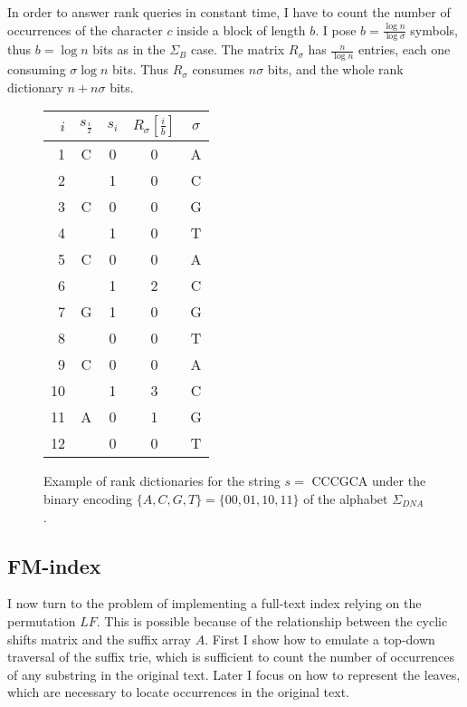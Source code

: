 In order to answer rank queries in constant time, I have to count the number of occurrences of the character $c$ inside a block of length $b$.
I pose $b=\frac{\log{n}}{\log{\sigma}}$ symbols, thus $b=\log{n}$ bits as in the $\Sigma_B$ case.
The matrix $R_{\sigma}$ has $\frac{n}{\log{n}}$ entries, each one consuming $\sigma \log{n}$ bits.
Thus $R_{\sigma}$ consumes $n \sigma$ bits, and the whole rank dictionary $n + n \sigma$ bits.

\begin{figure}[h]
\begin{center}
\caption[Example of rank dictionaries]{Example of rank dictionaries for the string $s=$ {\ttfamily CCCGCA} under the binary encoding $\{ A,C,G,T \} = \{ 00,01,10,11 \}$ of the alphabet $\Sigma_{DNA}$.}
\label{fig:rd_dna}
\ttfamily
\begin{tabular}{rcccc}
$i$	& $s_{\frac{i}{2}}$	& $s_i$ & $R_{\sigma}[\frac{i}{b}]$ & $\sigma$\\
\midrule
1   & C & 0 & 0 & A\\
2   &   & 1 & 0 & C\\
3   & C & 0 & 0 & G\\
4   &   & 1 & 0 & T\\
5   & C & 0 & 0 & A\\
6   &   & 1 & 2 & C\\
7   & G & 1 & 0 & G\\
8   &   & 0 & 0 & T\\
9   & C & 0 & 0 & A\\
10  &   & 1 & 3 & C\\
11  & A & 0 & 1 & G\\
12  &   & 0 & 0 & T\\
\end{tabular}
\end{center}
\end{figure}



\subsection{FM-index}
\label{sub:fmtrie}

I now turn to the problem of implementing a full-text index relying on the permutation $LF$.
This is possible because of the relationship between the cyclic shifts matrix and the suffix array $A$.
First I show how to emulate a top-down traversal of the suffix trie, which is sufficient to count the number of occurrences of any substring in the original text.
Later I focus on how to represent the leaves, which are necessary to locate occurrences in the original text.

